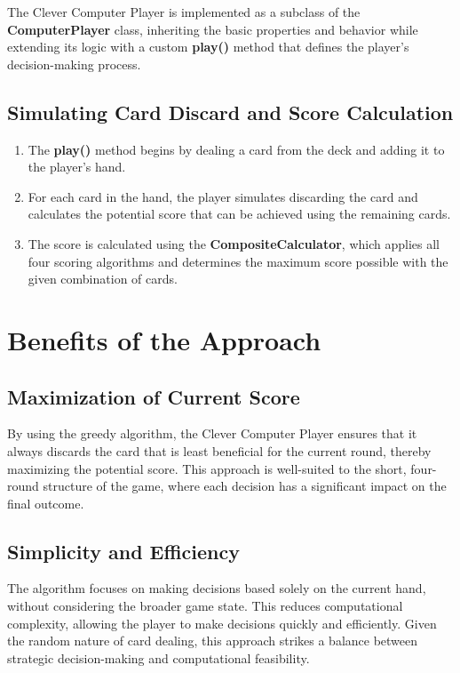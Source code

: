 \documentclass[a4paper, 12pt]{report}
\begin{document}
    The Clever Computer Player is implemented as a subclass of the \textbf{ComputerPlayer} class, inheriting the basic properties and behavior while extending its logic with a custom \textbf{play()} method that defines the player's decision-making process.

    \subsection{Simulating Card Discard and Score Calculation}
    \begin{enumerate}
        \item The \textbf{play()} method begins by dealing a card from the deck and adding it to the player's hand.
        \item For each card in the hand, the player simulates discarding the card and calculates the potential score that can be achieved using the remaining cards.
        \item The score is calculated using the \textbf{CompositeCalculator}, which applies all four scoring algorithms and determines the maximum score possible with the given combination of cards.
    \end{enumerate}

    \section{Benefits of the Approach}
    \subsection{Maximization of Current Score}
    By using the greedy algorithm, the Clever Computer Player ensures that it always discards the card that is least beneficial for the current round, thereby maximizing the potential score. This approach is well-suited to the short, four-round structure of the game, where each decision has a significant impact on the final outcome.
    \subsection{Simplicity and Efficiency}
    The algorithm focuses on making decisions based solely on the current hand, without considering the broader game state. This reduces computational complexity, allowing the player to make decisions quickly and efficiently. Given the random nature of card dealing, this approach strikes a balance between strategic decision-making and computational feasibility.
    
\end{document}
